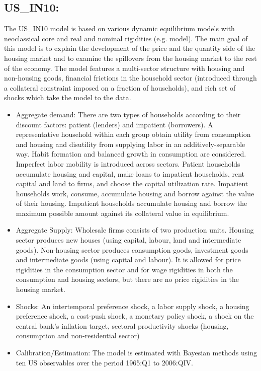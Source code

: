 \documentclass[11pt,a4paper]{article}
\begin{document}
	\subsection{US\_IN10: \cite{IacovielloNeri2010}}
	\label{USIN10}
	
	The US\_IN10 model is based on various dynamic equilibrium models with neoclassical core and real and nominal rigidities (e.g. \cite{SmetsWouters2007} model). The main goal of this model is to explain the development of the price and the quantity side of the housing market and to examine the spillovers from the housing market to the rest of the economy. The model features a multi-sector structure with housing and non-housing goods, financial frictions in the household sector (introduced through a collateral constraint imposed on a fraction of households), and rich set of shocks which take the model to the data. \\
	
	\begin{itemize}
		
		\item Aggregate demand: There are two types of households according to their discount factors: patient (lenders) and impatient (borrowers). A representative household within each group obtain utility from consumption and housing and disutility from supplying labor in an additively-separable way. Habit formation and balanced growth in consumption are considered. Imperfect labor mobility is introduced across sectors. Patient households accumulate housing and capital, make loans to impatient households, rent capital and land to firms, and choose the capital utilization rate. Impatient households work, consume, accumulate housing and borrow against the value of their housing. Impatient households accumulate housing and borrow the maximum possible amount against its collateral value in equilibrium.
		
		\item Aggregate Supply: Wholesale firms consists of two production units. Housing sector produces new houses (using capital, labour, land and intermediate goods). Non-housing sector produces consumption goods, investment goods and intermediate goods (using capital and labour). It is allowed for price rigidities in the consumption sector and for wage rigidities in both the consumption and housing sectors, but there are no price rigidities in the housing market.
		
		\item Shocks: An intertemporal preference shock, a labor supply shock, a housing preference shock, a cost-push shock, a monetary policy shock, a shock on the central bank's inflation target, sectoral productivity shocks (housing, consumption and non-residential sector)
		
		\item Calibration/Estimation: The model is estimated with Bayesian methods using ten US observables over the period 1965:Q1 to 2006:QIV.
	\end{itemize}
	
\end{document}
